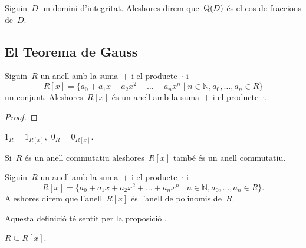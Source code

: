 \documentclass[../../main.tex]{subfiles}
\begin{document}
    \begin{definition}
        \label{def:cos de fraccions}
        Siguin~\(D\) un domini d'integritat.
        Aleshores direm que~\(\operatorname{Q}(D)\) és el cos de fraccions de~\(D\).
    \end{definition}
    \subsection{El Teorema de Gauss}
    \begin{proposition}
        \label{prop:l'anell de polinomis és un anell}
        Siguin~\(R\) un anell amb la suma~\(+\) i el producte~\(\cdot\) i
        \[
            R[x]=\{a_{0}+a_{1}x+a_{2}x^{2}+\dots+a_{n}x^{n}\mid n\in\mathbb{N}, a_{0},\dots,a_{n}\in R\}
        \]
        un conjunt.
        Aleshores~\(R[x]\) és un anell amb la suma~\(+\) i el producte~\(\cdot\).
        \begin{proof}
        \end{proof}
    \end{proposition}
    \begin{observation}
        \label{obs:els anells de polinomis conserven neutre i unitat}
        \(1_{R}=1_{R[x]}\),~\(0_{R}=0_{R[x]}\).
    \end{observation}
    \begin{observation}
        \label{obs:els anells de polinomis conserven commutativitat}
        Si~\(R\) és un anell commutatiu aleshores~\(R[x]\) també és un anell commutatiu.
    \end{observation}
    \begin{definition}
        \label{def:anell de polinomis}
        Siguin~\(R\) un anell amb la suma~\(+\) i el producte~\(\cdot\) i
        \[
            R[x]=\{a_{0}+a_{1}x+a_{2}x^{2}+\dots+a_{n}x^{n}\mid n\in\mathbb{N},a_{0},\dots,a_{n}\in R\}.
        \]
        Aleshores direm que l'anell~\(R[x]\) és l'anell de polinomis de~\(R\).

        Aquesta definició té sentit per la proposició .
    \end{definition}
    \begin{observation}
        \label{obs:un anell està contingut en el seu anell de polinomis}
        \(R\subseteq R[x]\).
    \end{observation}
\end{document}
